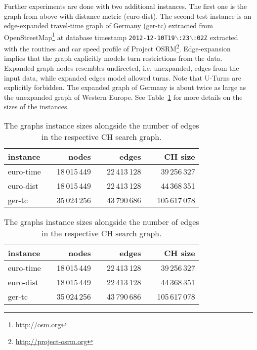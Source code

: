 \documentclass{llncs}
\begin{document}
Further experiments are done with two additional instances.
The first one is the graph from above with distance metric (euro-dist).
The second test instance is an edge-expanded travel-time graph of Germany (ger-tc) extracted from OpenStreetMap\footnote{\url{http://osm.org}} at database timestamp \texttt{2012-12-10T19$\backslash$:23$\backslash$:02Z} extracted with the routines and car speed profile of Project OSRM\footnote{\url{http://project-osrm.org}}.
Edge-expansion implies that the graph explicitly models turn restrictions from the data.
Expanded graph nodes resembles undirected, i.e. unexpanded, edges from the input data, while expanded edges model allowed turns.
Note that U-Turns are explicitly forbidden.
The expanded graph of Germany is about twice as large as the unexpanded graph of Western Europe.
See Table~\ref{tab:tnr-graphs} for more details on the sizes of the instances.

\begin{table}[bth]
\caption{The graphs instance sizes alongside the number of edges in the respective CH search graph.}
\label{tab:tnr-graphs}
\centering
\begin{tabular}{lcrcrcr}
\toprule 
 instance & & nodes & & edges & & CH size \\
\midrule
 euro-time 	&  & 18\,015\,449 & & 22\,413\,128 & & 39\,256\,327 \\
 euro-dist 	&  & 18\,015\,449 & & 22\,413\,128 & & 44\,368\,351 \\
 ger-tc 		&  & 35\,024\,256 & & 43\,790\,686 & & 105\,617\,078  \\
\bottomrule 
\end{tabular}
\end{table}


\begin{table}[b]
\caption{The graphs instance sizes alongside the number of edges in the respective CH search graph.}
\label{tab:graphs}
\centering
\begin{tabular}{lcrcrcr}
\toprule 
 instance & & nodes & & edges & & CH size \\
\midrule
 euro-time 	&  & 18\,015\,449 & & 22\,413\,128 & & 39\,256\,327 \\
 euro-dist 	&  & 18\,015\,449 & & 22\,413\,128 & & 44\,368\,351 \\
 ger-tc 		&  & 35\,024\,256 & & 43\,790\,686 & & 105\,617\,078  \\
\bottomrule 
\end{tabular}
\end{table}
\end{document}
